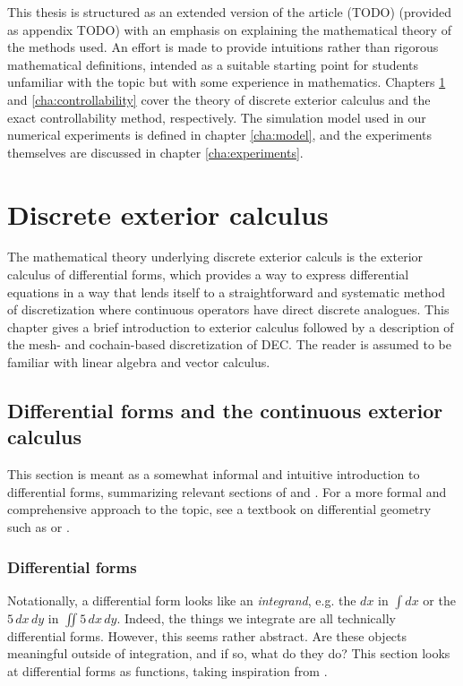\documentclass[utf8,english]{gradu3}
\begin{document}
This thesis is structured as an extended version of the article (TODO)
(provided as appendix TODO)
with an emphasis on explaining the mathematical theory of the methods used.
An effort is made to provide intuitions rather than rigorous mathematical definitions,
intended as a suitable starting point for students unfamiliar with the topic
but with some experience in mathematics.
Chapters \ref{cha:dec} and \ref{cha:controllability} cover the theory of discrete exterior calculus
and the exact controllability method, respectively.
The simulation model used in our numerical experiments is defined in chapter \ref{cha:model},
and the experiments themselves are discussed in chapter \ref{cha:experiments}.


\chapter{Discrete exterior calculus}\label{cha:dec}

The mathematical theory underlying discrete exterior calculs
is the exterior calculus of differential forms,
which provides a way to express differential equations
in a way that lends itself to a straightforward and systematic
method of discretization where continuous operators
have direct discrete analogues.
This chapter gives a brief introduction to exterior calculus
followed by a description of the mesh- and cochain-based discretization of DEC.
The reader is assumed to be familiar with linear algebra and vector calculus.


\section{Differential forms and the continuous exterior calculus}

This section is meant as a somewhat informal and intuitive introduction
to differential forms, summarizing relevant sections of
\parencite{blair_perot_differential_2014} and \parencite{crane_digital_2013}.
For a more formal and comprehensive approach to the topic,
see a textbook on differential geometry such as \parencite{lee_introduction_2012}
or \parencite{abraham_manifolds_2012}.


\subsection{Differential forms}

Notationally, a differential form looks like an \textit{integrand},
e.g. the $dx$ in $\int dx$ or the $5\,dx\,dy$ in $\iint 5\,dx\,dy$.
Indeed, the things we integrate are all technically differential forms.
However, this seems rather abstract.
Are these objects meaningful outside of integration,
and if so, what do they do?
This section looks at differential forms as functions,
taking inspiration from \parencite{crane_digital_2013}.
\end{document}

